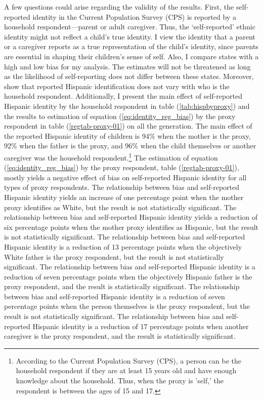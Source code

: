 \documentclass[12pt, fullpage]{article}
\begin{document}
A few questions could arise regarding the validity of the results. First, the self-reported identity in the Current Population Survey (CPS) is reported by a household respondent---parent or adult caregiver. Thus, the `self-reported' ethnic identity might not reflect a child's true identity. I view the identity that a parent or a caregiver reports as a true representation of the child's identity, since parents are essential in shaping their children's sense of self. Also, I compare states with a high and low bias for my analysis. The estimates will not be threatened as long as the likelihood of self-reporting does not differ between these states. 
Moreover, \citet{duncanIntermarriageIntergenerationalTransmission2011} show that reported Hispanic identification does not vary with who is the household respondent. Additionally, I present the main effect of self-reported Hispanic identity by the household respondent in table (\ref{tab:hispbyproxy}) and the results to estimation of equation (\ref{eq:identity_reg_bias}) by the proxy respondent in table (\ref{regtab-proxy-01}) on all the generation. The main effect of the reported Hispanic identity of children is 94\% when the mother is the proxy, 92\% when the father is the proxy, and 96\% when the child themselves or another caregiver was the household respondent.\footnote{According to the Current Population Survey (CPS), a person can be the household respondent if they are at least 15 years old and have enough knowledge about the household. Thus, when the proxy is 'self,' the respondent is between the ages of 15 and 17.} The estimation of equation (\ref{eq:identity_reg_bias}) by the proxy respondent, table (\ref{regtab-proxy-01}), mostly yields a negative effect of bias on self-reported Hispanic identity for all types of proxy respondents. The relationship between bias and self-reported Hispanic identity yields an increase of one percentage point when the mother proxy identifies as White, but the result is not statistically significant. The relationship between bias and self-reported Hispanic identity yields a reduction of six percentage points when the mother proxy identifies as Hispanic, but the result is not statistically significant. The relationship between bias and self-reported Hispanic identity is a reduction of 13 percentage points when the objectively White father is the proxy respondent, but the result is not statistically significant. The relationship between bias and self-reported Hispanic identity is a reduction of seven percentage points when the objectively Hispanic father is the proxy respondent, and the result is statistically significant. The relationship between bias and self-reported Hispanic identity is a reduction of seven percentage points when the person themselves is the proxy respondent, but the result is not statistically significant. The relationship between bias and self-reported Hispanic identity is a reduction of 17 percentage points when another caregiver is the proxy respondent, and the result is statistically significant. 
\end{document}
